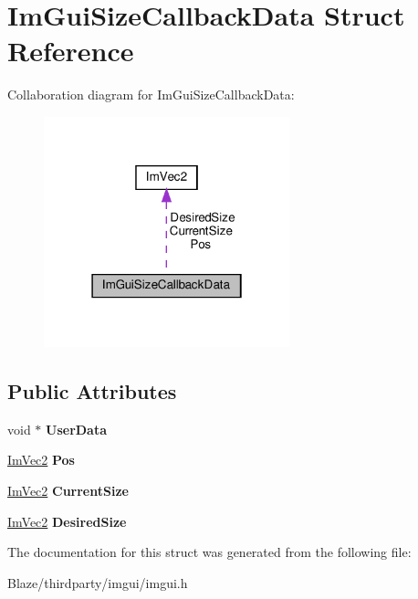 \hypertarget{structImGuiSizeCallbackData}{}\section{Im\+Gui\+Size\+Callback\+Data Struct Reference}
\label{structImGuiSizeCallbackData}


Collaboration diagram for Im\+Gui\+Size\+Callback\+Data\+:\nopagebreak
\begin{figure}[H]
\begin{center}
\leavevmode
\includegraphics[width=202pt]{structImGuiSizeCallbackData__coll__graph}
\end{center}
\end{figure}
\subsection*{Public Attributes}
\begin{DoxyCompactItemize}
\item 
\mbox{\label{structImGuiSizeCallbackData_ae16a4a1b916810b2f69925c527430a39}} 
void $\ast$ {\bfseries User\+Data}
\item 
\mbox{\label{structImGuiSizeCallbackData_a64fc0959664ddba84e051baaeaa9a042}} 
\hyperlink{structImVec2}{Im\+Vec2} {\bfseries Pos}
\item 
\mbox{\label{structImGuiSizeCallbackData_ac26746d231819ccb5a274ff78c6fa64e}} 
\hyperlink{structImVec2}{Im\+Vec2} {\bfseries Current\+Size}
\item 
\mbox{\label{structImGuiSizeCallbackData_a42be6d99a279942b4f2019a4416f65ba}} 
\hyperlink{structImVec2}{Im\+Vec2} {\bfseries Desired\+Size}
\end{DoxyCompactItemize}


The documentation for this struct was generated from the following file\+:\begin{DoxyCompactItemize}
\item 
Blaze/thirdparty/imgui/imgui.\+h\end{DoxyCompactItemize}
